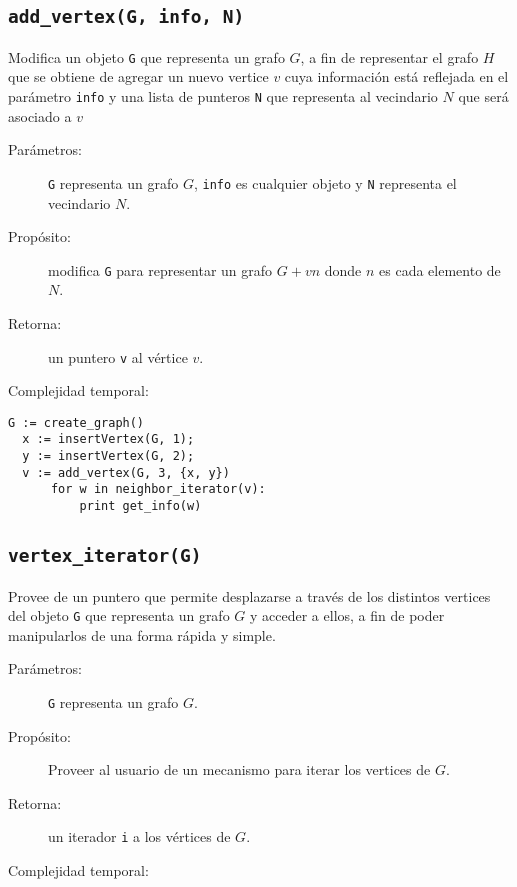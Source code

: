 \documentclass[a4paper,12pt]{article}
\makeatletter
\newcommand{\Code}[1]{\lstinline[basicstyle={\tt}]@#1@}
\makeatother
\begin{document}
\subsection{\texttt{add\_vertex(G, info, N)}}
\label{sec:tad grafo:add-vertex}

Modifica un objeto \Code{G} que representa un grafo $G$, a fin de representar el grafo $H$ que se obtiene de agregar un nuevo vertice $v$ cuya información está reflejada en el parámetro \Code{info} y una lista de punteros \Code{N} que representa al vecindario $N$ que será asociado a $v$

\begin{description}
  \item [Parámetros:] \Code{G} representa un grafo $G$, \Code{info} es cualquier objeto y \Code{N} representa el vecindario $N$.
  \item [Propósito:] modifica \Code{G} para representar un grafo $G + vn$ donde $n$ es cada elemento de $N$.
  \item [Retorna:] un puntero \Code{v} al vértice $v$.
  \item [Complejidad temporal:]
\end{description}


\begin{lstlisting}[caption={Ejemplo de uso de add\_vertex. El código crea un grafo $G$ con tres vertices, teniendo el tercer vertice, llamado $v$, a los otros dos como vecinos. Luego, el ciclo imprime ``12''.},gobble=2,float=ht,label={lst:pseudo:add_vertex},emph={add_vertex}]
  G := create_graph()
  x := insertVertex(G, 1);
  y := insertVertex(G, 2);
  v := add_vertex(G, 3, {x, y})
      for w in neighbor_iterator(v):
          print get_info(w)
\end{lstlisting}


\subsection{\Code{vertex_iterator(G)}}%
\label{sec:tad grafo:vertex-iterator}

Provee de un puntero que permite desplazarse a través de los distintos vertices del objeto \texttt{G} que representa un grafo $G$ y acceder a ellos, a fin de poder manipularlos de una forma rápida y simple.

\begin{description}
  \item [Parámetros:] \Code{G} representa un grafo $G$.
  \item [Propósito:] Proveer al usuario de un mecanismo para iterar los vertices de $G$.
  \item [Retorna:] un iterador \Code{i} a los vértices de $G$.
  \item [Complejidad temporal:]
\end{description}
\end{document}
